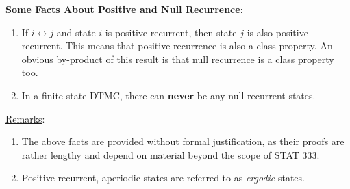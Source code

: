 \begin{Regular}
    \textbf{Some Facts About Positive and Null Recurrence}:
    \begin{enumerate}[1.]
        \item If $ i\leftrightarrow j $ and state $i$ is positive recurrent, then state $j$ is also positive recurrent. This
              means that positive recurrence is also a class property. An obvious by-product of this
              result is that null recurrence is a class property too.
        \item In a finite-state DTMC, there can \textbf{never} be any null recurrent states.
    \end{enumerate}
    \tcblower{}
    \underline{Remarks}:
    \begin{enumerate}[(1)]
        \item The above facts are provided without formal justification, as their proofs are rather
              lengthy and depend on material beyond the scope of STAT 333.
        \item Positive recurrent, aperiodic states are referred to as \emph{ergodic} states.
    \end{enumerate}
\end{Regular}
